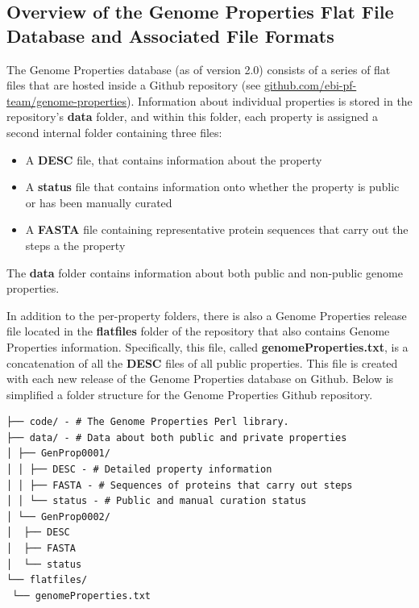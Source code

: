 \subsection{Overview of the Genome Properties Flat File Database and Associated File Formats} \label{Genome-Properties-Files} \label{genome-properties-files}

The Genome Properties database (as of version 2.0) consists of a series of flat files that are hosted inside a Github repository (see \href{github.com/ebi-pf-team/genome-properties}{github.com/ebi-pf-team/genome-properties}). Information about individual properties is stored in the repository's \textbf{data} folder, and within this folder, each property is assigned a second internal folder containing three files: 
\begin{itemize}
\item A \textbf{DESC} file, that contains information about the property
\item A \textbf{status} file that contains information onto whether the property is public or has been manually curated
\item A \textbf{FASTA} \cite{pearson19905} file containing representative protein sequences that carry out the steps a the property
\end{itemize}
The \textbf{data} folder contains information about both public and non-public genome properties. 

In addition to the per-property folders, there is also a Genome Properties release file located in the \textbf{flatfiles} folder of the repository that also contains Genome Properties information. Specifically, this file, called \textbf{genomeProperties.txt}, is a concatenation of all the \textbf{DESC} files of all public properties. This file is created with each new release of the Genome Properties database on Github. Below is simplified a folder structure for the Genome Properties Github repository.

\begin{verbatim}
├── code/ - # The Genome Properties Perl library.
├── data/ - # Data about both public and private properties
│ ├── GenProp0001/
│ │ ├── DESC - # Detailed property information
│ │ ├── FASTA - # Sequences of proteins that carry out steps
│ │ └── status - # Public and manual curation status
│ └── GenProp0002/
│  ├── DESC
│  ├── FASTA
│  └── status
└── flatfiles/
 └── genomeProperties.txt
\end{verbatim}

